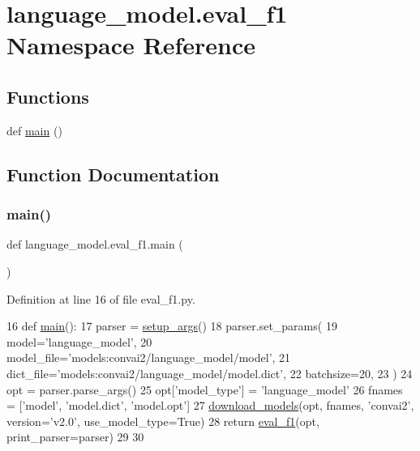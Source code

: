 \hypertarget{namespacelanguage__model_1_1eval__f1}{}\section{language\+\_\+model.\+eval\+\_\+f1 Namespace Reference}
\label{namespacelanguage__model_1_1eval__f1}
\subsection*{Functions}
\begin{DoxyCompactItemize}
\item 
def \hyperlink{namespacelanguage__model_1_1eval__f1_a88a3c5c1d47606053bd1b66ab08daf0e}{main} ()
\end{DoxyCompactItemize}


\subsection{Function Documentation}
\mbox{\label{namespacelanguage__model_1_1eval__f1_a88a3c5c1d47606053bd1b66ab08daf0e}} 
\subsubsection{\texorpdfstring{main()}{main()}}
{\footnotesize\ttfamily def language\+\_\+model.\+eval\+\_\+f1.\+main (\begin{DoxyParamCaption}{ }\end{DoxyParamCaption})}



Definition at line 16 of file eval\+\_\+f1.\+py.


\begin{DoxyCode}
16 \textcolor{keyword}{def }\hyperlink{namespaceseq2seq_1_1eval__f1_a99ede4f55975fd62d1d5834b72fa03c7}{main}():
17     parser = \hyperlink{namespaceprojects_1_1convai2_1_1eval__f1_a74826f78ce1ce6c9fe9b6d4a6297f3bd}{setup\_args}()
18     parser.set\_params(
19         model=\textcolor{stringliteral}{'language\_model'},
20         model\_file=\textcolor{stringliteral}{'models:convai2/language\_model/model'},
21         dict\_file=\textcolor{stringliteral}{'models:convai2/language\_model/model.dict'},
22         batchsize=20,
23     )
24     opt = parser.parse\_args()
25     opt[\textcolor{stringliteral}{'model\_type'}] = \textcolor{stringliteral}{'language\_model'}
26     fnames = [\textcolor{stringliteral}{'model'}, \textcolor{stringliteral}{'model.dict'}, \textcolor{stringliteral}{'model.opt'}]
27     \hyperlink{namespaceparlai_1_1core_1_1build__data_ab697f23f05d3e36d7979fe5e0ed7911e}{download\_models}(opt, fnames, \textcolor{stringliteral}{'convai2'}, version=\textcolor{stringliteral}{'v2.0'}, use\_model\_type=\textcolor{keyword}{True})
28     \textcolor{keywordflow}{return} \hyperlink{namespaceprojects_1_1convai2_1_1eval__f1_aac16a2ead8ff2b896c82411fe262f449}{eval\_f1}(opt, print\_parser=parser)
29 
30 
\end{DoxyCode}
